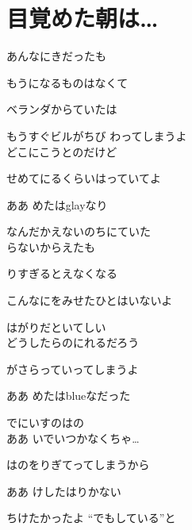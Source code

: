 \section{ 目覚めた朝は…}
\large{

あんなにきだったも

もうになるものはなくて

ベランダからていたは

もうすぐビルがちび わってしまうよ
\\

どこにこうとのだけど

せめてにるくらいはっていてよ

ああ めたはglayなり

なんだかえないのちにていた
\\

らないからえたも

りすぎるとえなくなる

こんなにをみせたひとはいないよ

はがりだといてしい
\\

どうしたらのにれるだろう

がさらっていってしまうよ

ああ めたはblueなだった

でにいすのはの
\\

ああ いでいつかなくちゃ…

はのをりぎてってしまうから

ああ けしたはりかない

ちけたかったよ “でもしている”と

}